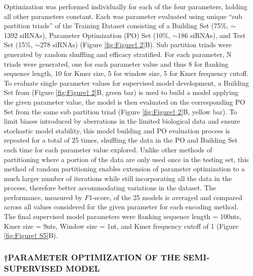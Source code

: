 \documentclass{report}
\begin{document}
Optimization was performed individually for each of the four parameters, holding all other parameters constant. Each was parameter evaluated using unique “sub partition triads” of the Training Dataset consisting of a Building Set (75\%, $\sim$1392 siRNAs), Parameter Optimization (PO) Set (10\%, $\sim$186 siRNAs), and Test Set (15\%, $\sim$278 siRNAs) (Figure \ref{fig:Figure† 2}B). Sub partition triads were generated by random shuffling and efficacy stratified. For each parameter, N triads were generated, one for each parameter value and thus 8 for flanking sequence length, 10 for Kmer size, 5 for window size, 5 for Kmer frequency cutoff. To evaluate single parameter values for supervised model development, a Building Set from (Figure \ref{fig:Figure† 2}B, green bar) is used to build a model applying the given parameter value, the model is then evaluated on the corresponding PO Set from the same sub partition triad (Figure \ref{fig:Figure† 2}B, yellow bar). To limit biases introduced by aberrations in the limited biological data and ensure stochastic model stability, this model building and PO evaluation process is repeated for a total of 25 times, shuffling the data in the PO and Building Set each time for each parameter value explored. Unlike other methods of partitioning where a portion of the data are only used once in the testing set, this method of random partitioning enables extension of parameter optimization to a much larger number of iterations while still incorporating all the data in the process, therefore better accommodating variations in the dataset. The performance, measured by $F1$-score, of the 25 models is averaged and compared across all values considered for the given parameter for each encoding method. The  final supervised model parameters were flanking sequence length = 100nts, Kmer size = 9nts, Window size = 1nt, and Kmer frequency cutoff of 1 (Figure \ref{fig:Figure† S5}B).



\subsubsection{†PARAMETER OPTIMIZATION OF THE SEMI-SUPERVISED MODEL }
\end{document}

